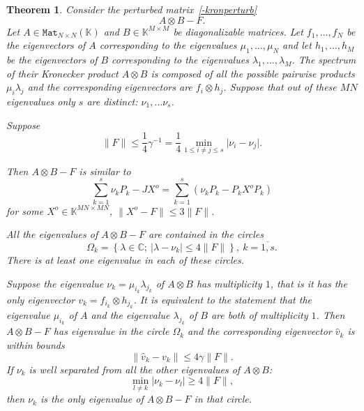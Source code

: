 \documentclass[14pt,a4paper]{extarticle}
\newtheorem{thm}{Theorem}
\theoremstyle{definition}
\begin{document}
\begin{thm}\label{nk:thm:kron}
    Consider the perturbed matrix~\eqref{-kronperturb}
        \[
            A{\otimes}B - F.
        \]
    Let \( A\in\mathtt{Mat}_{N{\times}N}(\mathbb{K}) \) and \( B\in\mathbb{K}^{M{\times}M} \)
        be diagonalizable matrices.
    Let \( f_1, \ldots, f_N \) be the eigenvectors of \( A \)
        corresponding to the eigenvalues \( \mu_1, \ldots, \mu_N \)
        and let \( h_1, \ldots, h_M \) be the eigenvectors of \( B \)
        corresponding to the eigenvalues \( \lambda_1, \ldots, \lambda_M \).
    The spectrum of their Kronecker product \( A{\otimes}B \)
        is composed of all the possible pairwise products \( \mu_i \lambda_j \)
        and the corresponding eigenvectors are \( f_i\otimes h_j \).
    Suppose that out of these \( MN \) eigenvalues only \( s \) are distinct:
        \( \nu_1, \ldots \nu_s \).

    Suppose
    \[
        \|F\| \leq \frac14 \gamma^{-1} = \frac14 \min_{1\leq i{\neq}j\leq s}\lvert\nu_i - \nu_j\rvert.
    \]

    Then \( A{\otimes}B - F \) is similar to
    \[ \sum_{k=1}^s \nu_k P_k - JX^o = \sum_{k=1}^s (\nu_k P_k - P_k X^o P_k) \]
    for some \( X^o \in \mathbb{K}^{MN{\times}MN} \),
    \( \|X^o - F\|\leq 3\|F\| \).

    All the eigenvalues of \( A{\otimes}B - F \) are contained in the circles
    \[
        \Omega_k = \left\{
            \lambda\in\mathbb{C};
            \ \lvert\lambda - \nu_k\rvert \leq 4\|F\|
            \right\},
        \ k{=}\overline{1,s}.
    \]
    There is at least one eigenvalue in each of these circles.

    Suppose the eigenvalue \( \nu_k=\mu_{i_k}\lambda_{j_k} \) of \( A{\otimes}B \) has multiplicity \( 1 \),
        that is it has the only eigenvector \( v_k = f_{i_k}{\otimes}h_{j_k} \).
    It is equivalent to the statement that the eigenvalue \( \mu_{i_k} \)
        of \( A \) and the eigenvalue \( \lambda_{j_k} \) of \( B \)
        are both of multiplicity \( 1 \).
    Then \( A{\otimes}B - F \) has eigenvalue in the circle \( \Omega_k \)
        and the corresponding eigenvector \( \hat{v}_k \) is within bounds
    \[
        \|\hat{v}_k - v_k\| \leq 4\gamma \|F\|.
    \]
    If \( \nu_k \) is well separated from all the other eigenvalues of \( A{\otimes}B \):
    \[
        \min_{l\neq k}
        \lvert
        \nu_k - \nu_l
        \rvert
        \geq 4\|F\|,
    \]
    then \( \nu_k \) is the only eigenvalue of \( A{\otimes}B - F \)
    in that circle.
\end{thm}
\end{document}
